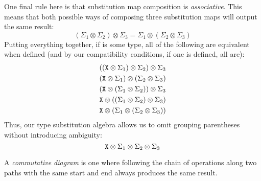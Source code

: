 \documentclass[../generics]{subfiles}
\begin{document}
One final rule here is that substitution map composition is \emph{associative}. This means that both possible ways of composing three substitution maps will output the same result:
\[
(\Sigma_1\otimes\Sigma_2)\otimes\Sigma_3=\Sigma_1\otimes(\Sigma_2\otimes\Sigma_3)
\]
Putting everything together, if \tX is some type, all of the following are equivalent when defined (and by our compatibility conditions, if one is defined, all are):
\begin{gather*}
((\texttt{X}\otimes\Sigma_1)\otimes\Sigma_2)\otimes\Sigma_3\\
(\texttt{X}\otimes\Sigma_1)\otimes(\Sigma_2\otimes\Sigma_3)\\
(\texttt{X}\otimes(\Sigma_1\otimes\Sigma_2))\otimes\Sigma_3\\
\texttt{X}\otimes((\Sigma_1\otimes\Sigma_2)\otimes\Sigma_3)\\
\texttt{X}\otimes(\Sigma_1\otimes(\Sigma_2\otimes\Sigma_3))
\end{gather*}
Thus, our type substitution algebra allows us to omit grouping parentheses without introducing ambiguity:
\[\texttt{X}\otimes\Sigma_1\otimes\Sigma_2\otimes\Sigma_3\]

A \emph{commutative diagram} is one where following the chain of operations along two paths with the same start and end always produces the same result.
\end{document}
